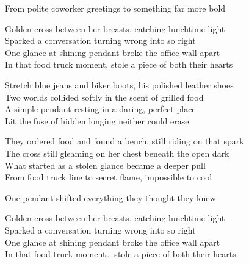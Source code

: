\begin{lyrics}
From polite coworker greetings to something far more bold

Golden cross between her breasts, catching lunchtime light\\
Sparked a conversation turning wrong into so right\\
One glance at shining pendant broke the office wall apart\\
In that food truck moment, stole a piece of both their hearts

Stretch blue jeans and biker boots, his polished leather shoes\\
Two worlds collided softly in the scent of grilled food\\
A simple pendant resting in a daring, perfect place\\
Lit the fuse of hidden longing neither could erase

They ordered food and found a bench, still riding on that spark\\
The cross still gleaming on her chest beneath the open dark\\
What started as a stolen glance became a deeper pull\\
From food truck line to secret flame, impossible to cool

One pendant shifted everything they thought they knew

Golden cross between her breasts, catching lunchtime light\\
Sparked a conversation turning wrong into so right\\
One glance at shining pendant broke the office wall apart\\
In that food truck moment… stole a piece of both their hearts

\end{lyrics}

